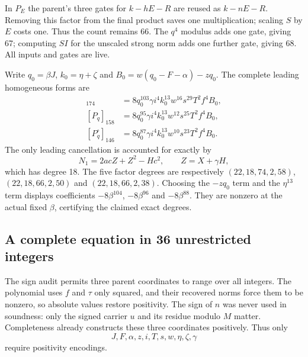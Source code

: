 In $P_E$ the parent's three gates for $k-hE-R$ are reused as $k-nE-R$.
Removing this factor from the final product saves one multiplication;
scaling $S$ by $E$ costs one. Thus the count remains 66. The $q^4$ modulus
adds one gate, giving 67; computing $SI$ for the unscaled strong norm adds
one further gate, giving 68. All inputs and gates are live.

Write $q_0=\beta J$, $k_0=\eta+\zeta$ and
$B_0=w(q_0-F-\alpha)-zq_0$. The complete leading homogeneous forms are
\begin{align*}
 [P_E]_{174}&=8q_0^{103}\gamma i^4k_0^{13}w^{16}s^{29}T^2f^4B_0,\\
 [P_q]_{158}&=8q_0^{95}\gamma i^4k_0^{13}w^{12}s^{25}T^2f^4B_0,\\
 [P_q^{\circ}]_{146}&=8q_0^{87}\gamma i^4k_0^{13}w^{10}s^{23}T^2f^4B_0.
\end{align*}
The only leading cancellation is accounted for exactly by
\[
 N_1=2acZ+Z^2-Hc^2,\qquad Z=X+\gamma H,
\]
which has degree 18. The five factor degrees are respectively
$(22,18,74,2,58)$, $(22,18,66,2,50)$ and $(22,18,66,2,38)$.
Choosing the $-zq_0$ term and the $\eta^{13}$ term displays coefficients
$-8\beta^{104}$, $-8\beta^{96}$ and $-8\beta^{88}$. They are nonzero at
the actual fixed $\beta$, certifying the claimed exact degrees.

\subsection{A complete equation in 36 unrestricted integers}\label{sec:ordinate36}

The sign audit permits three parent coordinates to range over all integers.
The polynomial uses $f$ and $\tau$ only squared, and their recovered norms
force them to be nonzero, so absolute values restore positivity.
The sign of $n$ was never used in soundness: only the signed carrier $u$
and its residue modulo $M$ matter. Completeness already constructs these
three coordinates positively. Thus only
\[
 J,F,\alpha,z,i,T,s,w,\eta,\zeta,\gamma
\]
require positivity encodings.

